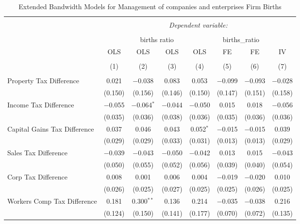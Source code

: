 
\begin{table}[!htbp] \centering 
  \caption{Extended Bandwidth Models for  Management of companies and enterprises Firm Births} 
  \label{} 
\begin{tabular}{@{\extracolsep{5pt}}lccccccc} 
\\[-1.8ex]\hline 
\hline \\[-1.8ex] 
 & \multicolumn{7}{c}{\textit{Dependent variable:}} \\ 
\cline{2-8} 
\\[-1.8ex] & \multicolumn{4}{c}{births ratio} & \multicolumn{2}{c}{births\_ratio} &   \\ 
 & OLS & OLS & OLS & OLS & FE & FE & IV \\ 
\\[-1.8ex] & (1) & (2) & (3) & (4) & (5) & (6) & (7)\\ 
\hline \\[-1.8ex] 
 Property Tax Difference & 0.021 & $-$0.038 & 0.083 & 0.053 & $-$0.099 & $-$0.093 & $-$0.028 \\ 
  & (0.150) & (0.156) & (0.146) & (0.150) & (0.147) & (0.151) & (0.158) \\ 
  Income Tax Difference & $-$0.055 & $-$0.064$^{*}$ & $-$0.044 & $-$0.050 & 0.015 & 0.018 & $-$0.056 \\ 
  & (0.035) & (0.036) & (0.038) & (0.036) & (0.035) & (0.036) & (0.036) \\ 
  Capital Gains Tax Difference & 0.037 & 0.046 & 0.043 & 0.052$^{*}$ & $-$0.015 & $-$0.015 & 0.039 \\ 
  & (0.029) & (0.029) & (0.033) & (0.031) & (0.013) & (0.013) & (0.029) \\ 
  Sales Tax Difference & $-$0.039 & $-$0.043 & $-$0.050 & $-$0.042 & 0.013 & 0.015 & $-$0.043 \\ 
  & (0.050) & (0.055) & (0.052) & (0.056) & (0.039) & (0.040) & (0.054) \\ 
  Corp Tax Difference & 0.008 & 0.001 & 0.006 & 0.004 & $-$0.019 & $-$0.020 & 0.010 \\ 
  & (0.026) & (0.025) & (0.027) & (0.025) & (0.025) & (0.026) & (0.025) \\ 
  Workers Comp Tax Difference & 0.181 & 0.300$^{**}$ & 0.136 & 0.214 & $-$0.035 & $-$0.038 & 0.216 \\ 
  & (0.124) & (0.150) & (0.141) & (0.177) & (0.070) & (0.072) & (0.135) \\ 

\end{tabular}
\end{table}

